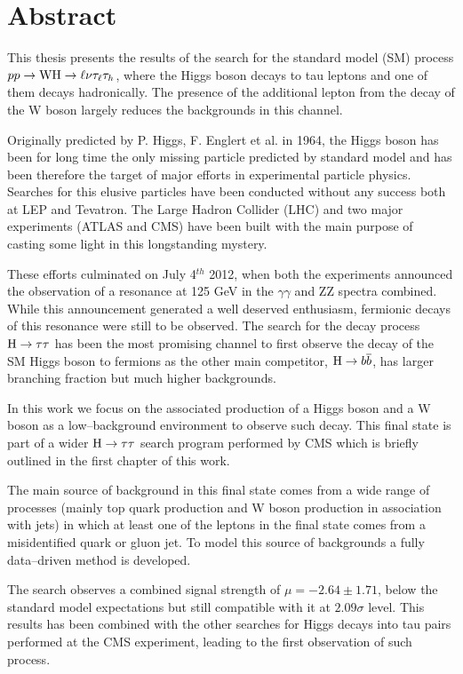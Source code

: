 \chapter*{Abstract}

This thesis presents the results of the search for the standard model (SM) process $pp \rightarrow \mathrm{W}\mathrm{H} \rightarrow \ell \nu \tau_\ell \tau_h$, where the Higgs boson decays to tau leptons and one of them decays hadronically. The presence of the additional lepton from the decay of the W boson largely reduces the backgrounds in this channel.

Originally predicted by P. Higgs, F. Englert et al. in 1964, the Higgs boson has been for long time the only missing particle predicted by standard model and has been therefore the target of major efforts in experimental particle physics. Searches for this elusive particles have been conducted without any success both at LEP and Tevatron. The Large Hadron Collider (LHC) and two major experiments (ATLAS and CMS) have been built with the main purpose of casting some light in this longstanding mystery. 

These efforts culminated on July 4$^{th}$ 2012, when both the experiments announced the observation of a resonance at 125 GeV in the $\gamma \gamma$ and ZZ spectra combined. While this announcement generated a well deserved enthusiasm, fermionic decays of this resonance were still to be observed. The search for the decay process $\mathrm{H} \rightarrow \tau \tau$ has been the most promising channel to first observe the decay of the SM Higgs boson to fermions as the other main competitor, $\mathrm{H} \rightarrow b\overline{b}$, has larger branching fraction but much higher backgrounds. 

In this work we focus on the associated production of a Higgs boson and a W boson as a low--background environment to observe such decay. This final state is part of a wider $\mathrm{H} \rightarrow \tau \tau$ search program performed by CMS which is briefly outlined in the first chapter of this work. 

The main source of background in this final state comes from a wide range of processes (mainly top quark production and W boson production in association with jets) in which at least one of the leptons in the final state comes from a misidentified quark or gluon jet. To model this source of backgrounds a fully data--driven method %
is developed.

The search observes a combined signal strength of $\mu = -2.64\pm1.71$,  below the standard model expectations but still compatible with it at $2.09\sigma$ level. This results has been combined with the other searches for Higgs decays into tau pairs performed at the CMS experiment, leading to the first observation of such process.
